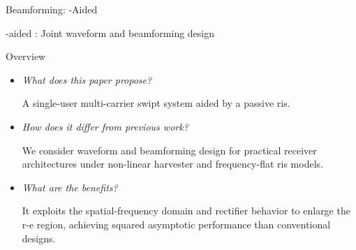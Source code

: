 \documentclass[presentation,xcolor={table},9pt]{beamer}
\begin{document}
\begin{section}{Beamforming: -Aided }
	\begin{frame}{-aided : Joint waveform and beamforming design}
		\begin{block}{Overview}
			\begin{itemize}\setlength\itemsep{20pt}
				\item \textit{What does this paper propose?}

				A single-user multi-carrier \gls{swipt} system aided by a passive \gls{ris}.
				\item \textit{How does it differ from previous work?}

				We consider waveform and beamforming design for practical receiver architectures under non-linear harvester and frequency-flat \gls{ris} models.
				\item \textit{What are the benefits?}

				It exploits the spatial-frequency domain and rectifier behavior to enlarge the \gls{r-e} region, achieving squared asymptotic performance than conventional designs.
			\end{itemize}
		\end{block}
	\end{frame}


\end{section}
\end{document}
